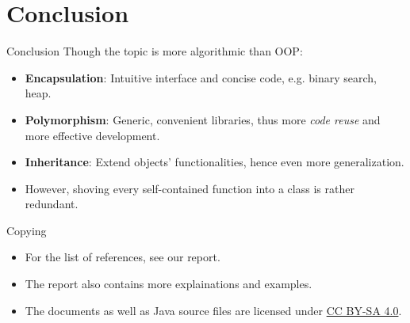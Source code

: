 \documentclass[pdf]{beamer}
\begin{document}
\section{Conclusion}
\begin{frame}{Conclusion}\Large
  Though the topic is more algorithmic than OOP:
  \begin{itemize}
    \item \textbf{Encapsulation}: Intuitive interface and concise code,
      e.g. binary search, heap.
    \item \textbf{Polymorphism}: Generic, convenient libraries,
      thus more \emph{code reuse} and more effective development.
    \item \textbf{Inheritance}: Extend objects' functionalities,
      hence even more generalization.
    \item However, shoving every self-contained function into a class
      is rather redundant.
  \end{itemize}
\end{frame}

\begin{frame}{Copying}\Large
  \begin{itemize}
    \item For the list of references, see our report.
    \item The report also contains more explainations and examples.
    \item The documents as well as Java source files are licensed under
      \href{https://creativecommons.org/licenses/by-sa/4.0/}{CC BY-SA 4.0}.
  \end{itemize}
\end{frame}
\end{document}
